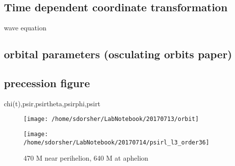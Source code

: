 \subsection{Time dependent coordinate transformation}
wave equation

\subsection{orbital parameters (osculating orbits paper)}
\subsection{precession figure}
chi(t),psir,psirtheta,psirphi,psirt

\begin{figure}
\texttt{[image: /home/sdorsher/LabNotebook/20170713/orbit]}
\end{figure}




\begin{figure}
  \texttt{[image: /home/sdorsher/LabNotebook/20170714/psirl\_l3\_order36]}
  \caption{470 M near perihelion, 640 M at aphelion}
\end{figure}
